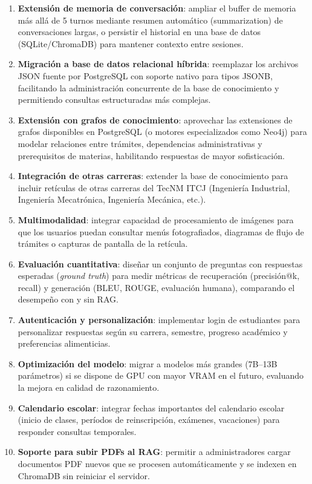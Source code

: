 \begin{enumerate}
    \item \textbf{Extensión de memoria de conversación}: ampliar el buffer de memoria más allá de 5 turnos mediante resumen automático (summarization) de conversaciones largas, o persistir el historial en una base de datos (SQLite/ChromaDB) para mantener contexto entre sesiones.
    \item \textbf{Migración a base de datos relacional híbrida}: reemplazar los archivos JSON fuente por PostgreSQL con soporte nativo para tipos JSONB, facilitando la administración concurrente de la base de conocimiento y permitiendo consultas estructuradas más complejas.
    \item \textbf{Extensión con grafos de conocimiento}: aprovechar las extensiones de grafos disponibles en PostgreSQL (o motores especializados como Neo4j) para modelar relaciones entre trámites, dependencias administrativas y prerequisitos de materias, habilitando respuestas de mayor sofisticación.
    \item \textbf{Integración de otras carreras}: extender la base de conocimiento para incluir retículas de otras carreras del TecNM ITCJ (Ingeniería Industrial, Ingeniería Mecatrónica, Ingeniería Mecánica, etc.).
    \item \textbf{Multimodalidad}: integrar capacidad de procesamiento de imágenes para que los usuarios puedan consultar menús fotografiados, diagramas de flujo de trámites o capturas de pantalla de la retícula.
    \item \textbf{Evaluación cuantitativa}: diseñar un conjunto de preguntas con respuestas esperadas (\textit{ground truth}) para medir métricas de recuperación (precisión@k, recall) y generación (BLEU, ROUGE, evaluación humana), comparando el desempeño con y sin RAG.
    \item \textbf{Autenticación y personalización}: implementar login de estudiantes para personalizar respuestas según su carrera, semestre, progreso académico y preferencias alimenticias.
    \item \textbf{Optimización del modelo}: migrar a modelos más grandes (7B--13B parámetros) si se dispone de GPU con mayor VRAM en el futuro, evaluando la mejora en calidad de razonamiento.
    \item \textbf{Calendario escolar}: integrar fechas importantes del calendario escolar (inicio de clases, períodos de reinscripción, exámenes, vacaciones) para responder consultas temporales.
    \item \textbf{Soporte para subir PDFs al RAG}: permitir a administradores cargar documentos PDF nuevos que se procesen automáticamente y se indexen en ChromaDB sin reiniciar el servidor.
\end{enumerate}
